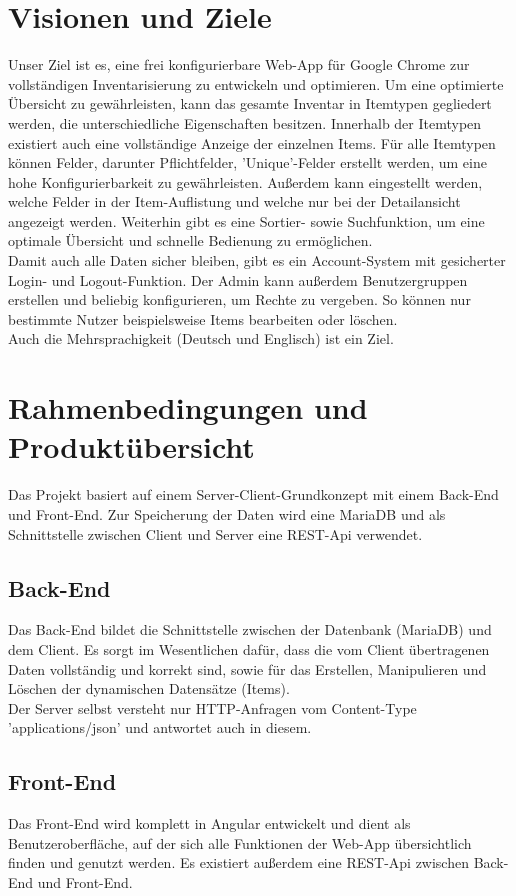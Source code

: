 \documentclass[11pt,a4paper]{report}
\begin{document}
	\section{Visionen und Ziele}
	Unser Ziel ist es, eine frei konfigurierbare Web-App für Google Chrome zur vollständigen Inventarisierung zu entwickeln und optimieren. Um eine optimierte Übersicht zu gewährleisten, kann das gesamte Inventar in Itemtypen gegliedert werden, die unterschiedliche Eigenschaften besitzen. Innerhalb der Itemtypen existiert auch eine vollständige Anzeige der einzelnen Items. Für alle Itemtypen können Felder, darunter Pflichtfelder, 'Unique'-Felder erstellt werden, um eine hohe Konfigurierbarkeit zu gewährleisten. Außerdem kann eingestellt werden, welche Felder in der Item-Auflistung und welche nur bei der Detailansicht angezeigt werden. Weiterhin gibt es eine Sortier- sowie Suchfunktion, um eine optimale Übersicht und schnelle Bedienung zu ermöglichen.\\
Damit auch alle Daten sicher bleiben, gibt es ein Account-System mit gesicherter Login- und Logout-Funktion. Der Admin kann außerdem Benutzergruppen erstellen und beliebig konfigurieren, um Rechte zu vergeben. So können nur bestimmte Nutzer beispielsweise Items bearbeiten oder löschen.\\
	Auch die Mehrsprachigkeit (Deutsch und Englisch) ist ein Ziel.
	
	\section{Rahmenbedingungen und Produktübersicht}
	Das Projekt basiert auf einem Server-Client-Grundkonzept mit einem Back-End und Front-End. Zur Speicherung der Daten wird eine MariaDB und als Schnittstelle zwischen Client und Server eine REST-Api verwendet.
	\subsection{Back-End}
	Das Back-End bildet die Schnittstelle zwischen der Datenbank (MariaDB) und dem Client.
	Es sorgt im Wesentlichen dafür, dass die vom Client übertragenen Daten vollständig und korrekt sind, sowie für das Erstellen, Manipulieren und Löschen der dynamischen Datensätze (Items).\\
	Der Server selbst versteht nur HTTP-Anfragen vom Content-Type 'applications/json' und antwortet auch in diesem.
	
	\subsection{Front-End}
	Das Front-End wird komplett in Angular entwickelt und dient als Benutzeroberfläche, auf der sich alle Funktionen der Web-App übersichtlich finden und genutzt werden. Es existiert außerdem eine REST-Api zwischen Back-End und Front-End.
	
\end{document}
